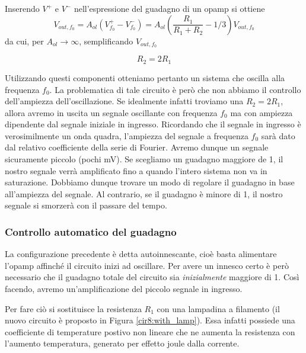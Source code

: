Inserendo $V^+$ e $V^-$ nell'espressione del guadagno di un opamp si ottiene
\vspace{-2mm}
\begin{equation}
	V_{out,f_0} = A_{ol}\left( V^+_{f_0} - V^-_{f_0} \right) = A_{ol}\left(\frac{R_1}{R_1+R_2} - 1/3\right)V_{out,f_0}
\end{equation}
\vspace{-4mm}
da cui, per $A_{ol} \rightarrow \infty$, semplificando $V_{out,f_0}$

\begin{equation}
	R_2 = 2 R_1
\end{equation}

Utilizzando questi componenti otteniamo pertanto un sistema che oscilla alla frequenza $f_0$.
La problematica di tale circuito è però che non abbiamo il controllo dell'ampiezza dell'oscillazione. Se idealmente infatti troviamo una $R_2 = 2 R_1$, allora avremo in uscita un segnale oscillante con frequenza $f_0$ ma con ampiezza dipendente dal segnale iniziale in ingresso. Ricordando che il segnale in ingresso è verosimilmente un onda quadra, l'ampiezza del segnale a frequenza $f_0$ sarà dato dal relativo coefficiente della serie di Fourier. Avremo dunque un segnale sicuramente piccolo (pochi \si{\milli\volt}). Se scegliamo un guadagno maggiore de 1, il nostro segnale verrà amplificato fino a quando l'intero sistema non va in saturazione. Dobbiamo dunque trovare un modo di regolare il guadagno in base all'ampiezza del segnale. Al contrario, se il guadagno è minore di 1, il nostro segnale si smorzerà con il passare del tempo. 

\subsubsection*{Controllo automatico del guadagno}

La configurazione precedente è detta autoinnescante, cioè basta alimentare l'opamp affinché il circuito inizi ad oscillare.
Per avere un innesco certo è però necessario che il guadagno totale del circuito sia \textit{inizialmente} maggiore di \num{1}. Così facendo, avremo un'amplificazione del piccolo segnale in ingresso.

Per fare ciò si sostituisce la resistenza $R_1$ con una lampadina a filamento (il nuovo circuito è proposto in Figura \ref{cir8:with_lamp}).
Essa infatti possiede una coefficiente di temperature postivo non lineare che ne aumenta la resistenza con l'aumento temperatura, generato per effetto joule dalla corrente.

